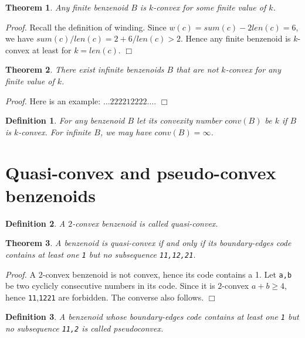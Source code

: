 \documentclass[a4paper,10pt]{article}
\newcounter{theorem}
\newtheorem{definition}{Definition}[section]
\newtheorem{theorem}{Theorem}[section]
\newenvironment{proof}{\medskip\emph{Proof.}}{\hfill$\Box$\medskip}
\newcommand\Tomo[1]{\textcolor{brown}{Tomo: #1}}
\begin{document}
{\begin{theorem}
Any finite benzenoid $B$ is $k$-convex for some finite value of $k$.
\end{theorem}

\begin{proof}
Recall the definition of winding. Since $w(c) = sum(c)-2len(c) = 6$, we have $sum(c)/len(c) = 2 + 6/len(c) > 2$. Hence any finite benzenoid is $k$-convex at least for $k = len(c)$. 
\end{proof}



\begin{theorem}
There exist infinite benzenoids $B$ that are not $k$-convex for any finite value of $k$.
\end{theorem}

\begin{proof}
Here is an example: $\ldots 222212222 \ldots$.
\end{proof}

\begin{definition}
For any benzenoid $B$ let its \emph{convexity number} $conv(B)$ be $k$ if $B$ is $k$-convex. For infinite $B$, we may have $conv(B) = \infty$.
\end{definition}

\section{Quasi-convex and pseudo-convex benzenoids}

\begin{definition}
A $2$-convex benzenoid is called \emph{quasi-convex.}
\end{definition}


\begin{theorem}
A benzenoid is quasi-convex if and only if its boundary-edges code contains at least one {\tt 1} but no subsequence {\tt 11,12,21}.
\end{theorem}

\begin{proof}
A $2$-convex benzenoid is not convex, hence its code contains a 1. Let {\tt a,b} be two cyclicly consecutive numbers in its code. Since it is $2$-convex $a+b \geq 4$, hence {\tt 11},{\tt 12}{\tt 21} are
forbidden.  The converse also follows.  
\end{proof}


\begin{definition}
A benzenoid whose boundary-edges code contains at least one {\tt 1} but no subsequence {\tt 11,2} is called \emph{pseudoconvex}.
\end{definition}

}
\end{document}
